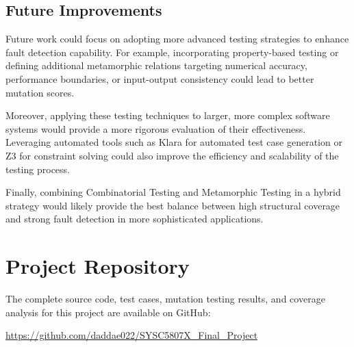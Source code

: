 \documentclass[conference]{IEEEtran}
\begin{document}
\subsection{Future Improvements}
Future work could focus on adopting more advanced testing strategies to enhance fault detection capability. For example, incorporating property-based testing or defining additional metamorphic relations targeting numerical accuracy, performance boundaries, or input-output consistency could lead to better mutation scores.

Moreover, applying these testing techniques to larger, more complex software systems would provide a more rigorous evaluation of their effectiveness. Leveraging automated tools such as Klara \cite{b1} for automated test case generation or Z3 \cite{b2} for constraint solving could also improve the efficiency and scalability of the testing process.

Finally, combining Combinatorial Testing and Metamorphic Testing in a hybrid strategy would likely provide the best balance between high structural coverage and strong fault detection in more sophisticated applications.

\section*{Project Repository}
The complete source code, test cases, mutation testing results, and coverage analysis for this project are available on GitHub:

\noindent \url{https://github.com/daddae022/SYSC5807X_Final_Project}
\end{document}
